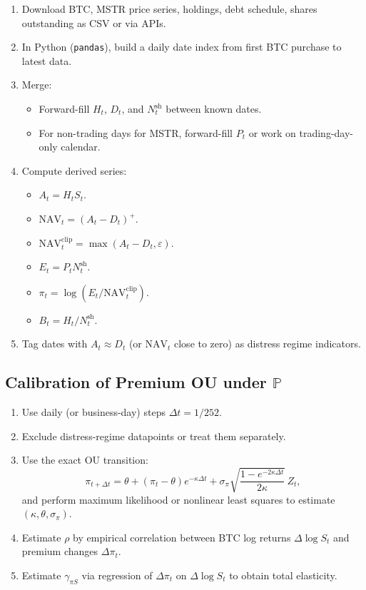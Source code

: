 \documentclass[11pt]{article}
\begin{document}
\begin{enumerate}
  \item Download BTC, MSTR price series, holdings, debt schedule, shares outstanding as CSV or via APIs.
  \item In Python (\texttt{pandas}), build a daily date index from first BTC purchase to latest data.
  \item Merge:
  \begin{itemize}
    \item Forward-fill $H_t$, $D_t$, and $N_t^{\text{sh}}$ between known dates.
    \item For non-trading days for MSTR, forward-fill $P_t$ or work on trading-day-only calendar.
  \end{itemize}
  \item Compute derived series:
  \begin{itemize}
    \item $A_t = H_t S_t$.
    \item $\text{NAV}_t = (A_t - D_t)^+$.
    \item $\text{NAV}_t^{\text{clip}} = \max(A_t - D_t,\varepsilon)$.
    \item $E_t = P_t N_t^{\text{sh}}$.
    \item $\pi_t = \log(E_t / \text{NAV}_t^{\text{clip}})$.
    \item $B_t = H_t / N_t^{\text{sh}}$.
  \end{itemize}
  \item Tag dates with $A_t \approx D_t$ (or $\text{NAV}_t$ close to zero) as distress regime indicators.
\end{enumerate}

\subsection{Calibration of Premium OU under $\mathbb P$}

\begin{enumerate}
  \item Use daily (or business-day) steps $\Delta t = 1/252$.
  \item Exclude distress-regime datapoints or treat them separately.
  \item Use the exact OU transition:
  $$
    \pi_{t+\Delta t}
    = \theta + (\pi_t - \theta)e^{-\kappa \Delta t}
      + \sigma_\pi \sqrt{\frac{1 - e^{-2\kappa\Delta t}}{2\kappa}}\,Z_t,
  $$
  and perform maximum likelihood or nonlinear least squares to estimate $(\kappa,\theta,\sigma_\pi)$.
  \item Estimate $\rho$ by empirical correlation between BTC log returns $\Delta \log S_t$ and premium changes $\Delta \pi_t$.
  \item Estimate $\gamma_{\pi S}$ via regression of $\Delta \pi_t$ on $\Delta \log S_t$ to obtain total elasticity.
\end{enumerate}
\end{document}
